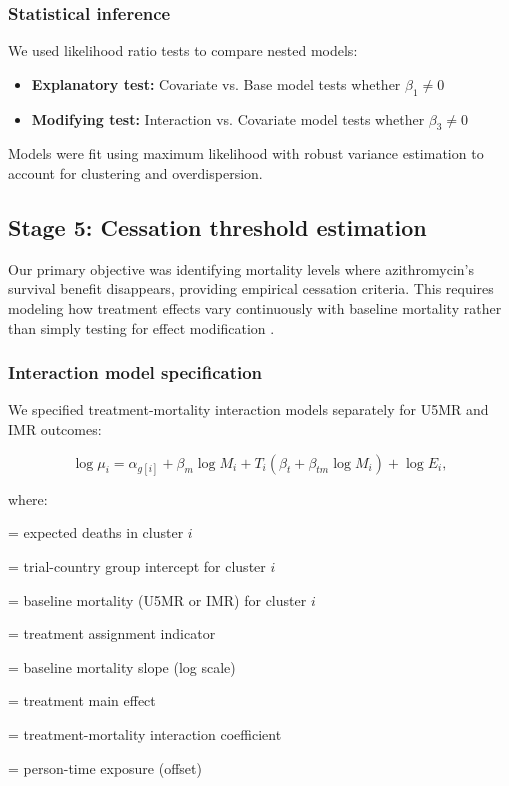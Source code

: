 \documentclass[11pt]{article}\usepackage[]{graphicx}\usepackage[]{xcolor}
\begin{document}
\subsubsection{Statistical inference}

We used likelihood ratio tests to compare nested models:
\begin{itemize}
\item \textbf{Explanatory test:} Covariate vs. Base model tests whether $\beta_1 \neq 0$
\item \textbf{Modifying test:} Interaction vs. Covariate model tests whether $\beta_3 \neq 0$
\end{itemize}

Models were fit using maximum likelihood with robust variance estimation to account for clustering and overdispersion.

\subsection{Stage 5: Cessation threshold estimation}

Our primary objective was identifying mortality levels where azithromycin's survival benefit disappears, providing empirical cessation criteria. This requires modeling how treatment effects vary continuously with baseline mortality rather than simply testing for effect modification \citep{oron2020ajtmh}.

\subsubsection{Interaction model specification}

We specified treatment-mortality interaction models separately for U5MR and IMR outcomes:

\begin{equation}
\log \mu_i = \alpha_{g[i]} + \beta_m \log M_i + T_i(\beta_t + \beta_{tm} \log M_i) + \log E_i,
\end{equation}

\noindent where:
\begin{description}[leftmargin=2em]
\item[$\mu_i$] = expected deaths in cluster $i$
\item[$\alpha_{g[i]}$] = trial-country group intercept for cluster $i$
\item[$M_i$] = baseline mortality (U5MR or IMR) for cluster $i$
\item[$T_i$] = treatment assignment indicator
\item[$\beta_m$] = baseline mortality slope (log scale)
\item[$\beta_t$] = treatment main effect
\item[$\beta_{tm}$] = treatment-mortality interaction coefficient
\item[$E_i$] = person-time exposure (offset)
\end{description}
\end{document}

